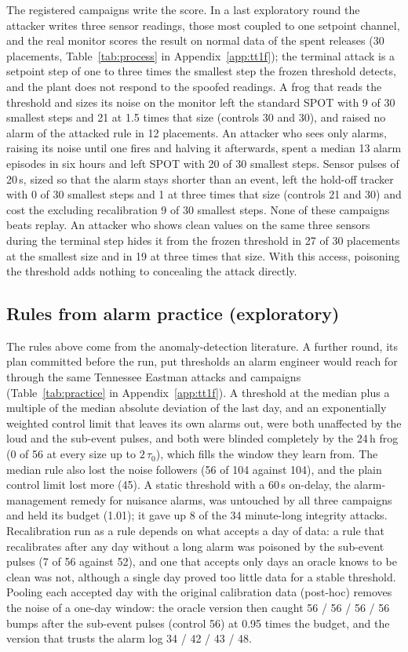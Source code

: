 \documentclass[sigconf]{acmart}
\begin{document}
The registered campaigns write the score. In a last exploratory round the attacker writes three sensor
readings, those most coupled to one setpoint channel, and the real monitor scores the result on normal
data of the spent releases (30 placements, Table~\ref{tab:process} in Appendix~\ref{app:tt1f}); the terminal attack is a setpoint
step of one to three times the smallest step the frozen threshold detects, and the plant does not
respond to the spoofed readings. A frog that reads the threshold and sizes its noise on the monitor
left the standard SPOT with 9 of 30 smallest steps and 21 at 1.5 times that size (controls 30 and 30),
and raised no alarm of the attacked rule in 12 placements. An attacker who sees only alarms, raising
its noise until one fires and halving it afterwards, spent a median 13 alarm episodes in six hours
and left SPOT with 20 of 30 smallest steps. Sensor pulses of 20\,s, sized so that the alarm stays shorter
than an event, left the hold-off tracker with 0 of 30 smallest steps and 1 at three times that size
(controls 21 and 30) and cost the excluding recalibration 9 of 30 smallest steps. None of these
campaigns beats replay. An attacker who shows clean values on the same three sensors during the
terminal step hides it from the frozen threshold in 27 of 30 placements at the smallest size and in
19 at three times that size. With this access, poisoning the threshold adds nothing to concealing
the attack directly.

\subsection{Rules from alarm practice (exploratory)}
\label{sec:practice}

The rules above come from the anomaly-detection literature. A further round, its plan committed before
the run, put thresholds an alarm engineer would reach for through the same Tennessee Eastman attacks and
campaigns (Table~\ref{tab:practice} in Appendix~\ref{app:tt1f}). A threshold at the median plus a
multiple of the median absolute deviation of the last day, and an exponentially weighted control limit
that leaves its own alarms out, were both unaffected by the loud and the sub-event pulses, and both were
blinded completely by the 24\,h frog (0 of 56 at every size up to $2\,\tau_0$), which fills the window
they learn from. The median rule also lost the noise followers (56 of 104 against 104), and the plain
control limit lost more (45). A static threshold with a 60\,s on-delay, the alarm-management remedy for
nuisance alarms, was untouched by all three campaigns and held its budget (1.01); it gave up 8 of the 34
minute-long integrity attacks. Recalibration run as a rule depends on what accepts a day of data: a rule
that recalibrates after any day without a long alarm was poisoned by the sub-event pulses (7 of 56
against 52), and one that accepts only days an oracle knows to be clean was not, although a single day proved
too little data for a stable threshold. Pooling each accepted day with the original calibration data (post-hoc) removes the noise of a one-day window:
the oracle version then caught 56 / 56 / 56 / 56 bumps after the sub-event pulses (control 56) at
0.95 times the budget, and the version that trusts the alarm log 34 / 42 / 43 / 48.
\end{document}
